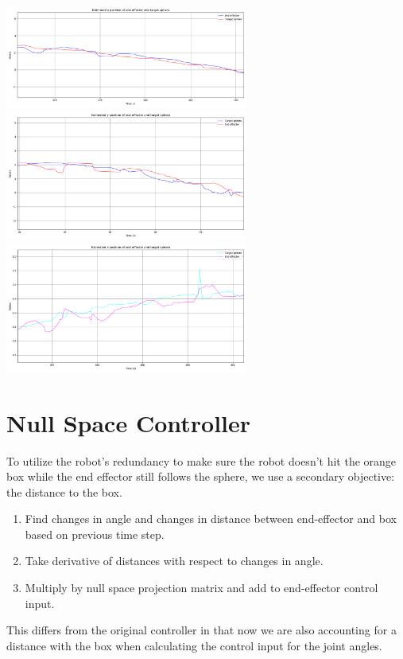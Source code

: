 \documentclass[11pt]{article}
\begin{document}
\begin{center}
\includegraphics[width=0.6\textwidth]{figures/x-pos.png}
\includegraphics[width=0.6\textwidth]{figures/y-pos.png}
\includegraphics[width=0.6\textwidth]{figures/z-pos.png}
\end{center}

\section{Null Space Controller}

To utilize the robot's redundancy to make sure the robot doesn't hit the orange box while the end effector still follows the sphere, we use a secondary objective: the distance to the box.
\begin{enumerate}
	\item Find changes in angle and changes in distance between end-effector and box based on previous time step.
	\item Take derivative of distances with respect to changes in angle.
	\item Multiply by null space projection matrix and add to end-effector control input.
\end{enumerate}
This differs from the original controller in that now we are also accounting for a distance with the box when calculating the control input for the joint angles.
\end{document}
